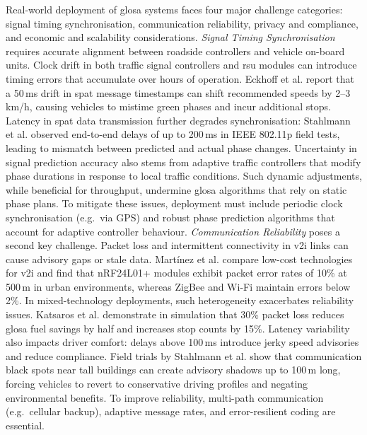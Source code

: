 Real-world deployment of \ac{glosa} systems faces four major challenge categories: signal timing synchronisation, communication reliability, privacy and compliance, and economic and scalability considerations.
\mynewline
\textit{Signal Timing Synchronisation} requires accurate alignment between roadside controllers and vehicle on-board units. Clock drift in both traffic signal controllers and \ac{rsu} modules can introduce timing errors that accumulate over hours of operation. Eckhoff et al. \cite{Eckhoff2013} report that a 50\,ms drift in \ac{spat} message timestamps can shift recommended speeds by 2--3\,km/h, causing vehicles to mistime green phases and incur additional stops. Latency in \ac{spat} data transmission further degrades synchronisation: Stahlmann et al. \cite{Stahlmann2018} observed end-to-end delays of up to 200\,ms in IEEE 802.11p field tests, leading to mismatch between predicted and actual phase changes. Uncertainty in signal prediction accuracy also stems from adaptive traffic controllers that modify phase durations in response to local traffic conditions. Such dynamic adjustments, while beneficial for throughput, undermine \ac{glosa} algorithms that rely on static phase plans. To mitigate these issues, deployment must include periodic clock synchronisation (e.g.\ via GPS) and robust phase prediction algorithms that account for adaptive controller behaviour.
\mynewline
\textit{Communication Reliability} poses a second key challenge. Packet loss and intermittent connectivity in \ac{v2i} links can cause advisory gaps or stale data. Martínez et al. \cite{Martinez2020} compare low-cost technologies for \ac{v2i} and find that nRF24L01+ modules exhibit packet error rates of 10\% at 500\,m in urban environments, whereas ZigBee and Wi-Fi maintain errors below 2\%. In mixed-technology deployments, such heterogeneity exacerbates reliability issues. Katsaros et al. \cite{Katsaros2011} demonstrate in simulation that 30\% packet loss reduces \ac{glosa} fuel savings by half and increases stop counts by 15\%. Latency variability also impacts driver comfort: delays above 100\,ms introduce jerky speed advisories and reduce compliance. Field trials by Stahlmann et al. \cite{Stahlmann2018} show that communication black spots near tall buildings can create advisory shadows up to 100\,m long, forcing vehicles to revert to conservative driving profiles and negating environmental benefits. To improve reliability, multi-path communication (e.g.\ cellular backup), adaptive message rates, and error-resilient coding are essential.
\mynewline
